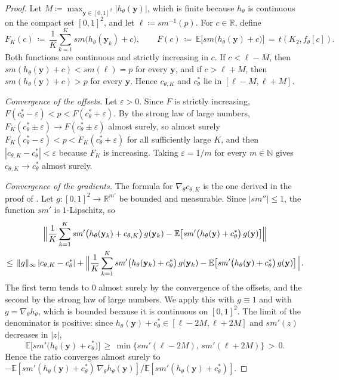\documentclass[11pt]{article}
\theoremstyle{plain}
\theoremstyle{definition}
\theoremstyle{remark}
\newcommand*{\R}{\mathbb{R}}
\begin{document}
\begin{proof}
Let $M \coloneqq \max_{\mathbf{y} \in [0,1]^2} |h_\theta(\mathbf{y})|$, which is finite because $h_\theta$ is continuous on the compact set $[0,1]^2$, and let $\ell \coloneqq \mathit{sm}^{-1}(p)$. For $c \in \R$, define
\[
F_K(c) \,\coloneqq\, \frac{1}{K} \sum_{k=1}^{K} \mathit{sm}\bigl(h_\theta(\mathbf{y}_k) + c\bigr),
\qquad
F(c) \,\coloneqq\, \mathbb{E}\bigl[\mathit{sm}\bigl(h_\theta(\mathbf{y}) + c\bigr)\bigr] \,=\, t(K_2, f_\theta[c]).
\]
Both functions are continuous and strictly increasing in $c$. If $c < \ell - M$, then $\mathit{sm}(h_\theta(\mathbf{y}) + c) < \mathit{sm}(\ell) = p$ for every $\mathbf{y}$, and if $c > \ell + M$, then $\mathit{sm}(h_\theta(\mathbf{y}) + c) > p$ for every $\mathbf{y}$. Hence $c_{\theta,K}$ and $c^*_\theta$ lie in $[\ell - M, \ell + M]$.

\emph{Convergence of the offsets.} Let $\varepsilon > 0$. Since $F$ is strictly increasing, $F(c^*_\theta - \varepsilon) < p < F(c^*_\theta + \varepsilon)$. By the strong law of large numbers, $F_K(c^*_\theta \pm \varepsilon) \to F(c^*_\theta \pm \varepsilon)$ almost surely, so almost surely $F_K(c^*_\theta - \varepsilon) < p < F_K(c^*_\theta + \varepsilon)$ for all sufficiently large $K$, and then $|c_{\theta,K} - c^*_\theta| < \varepsilon$ because $F_K$ is increasing. Taking $\varepsilon = 1/m$ for every $m \in \mathbb{N}$ gives $c_{\theta,K} \to c^*_\theta$ almost surely.

\emph{Convergence of the gradients.} The formula for $\nabla_\theta c_{\theta,K}$ is the one derived in the proof of . Let $g : [0,1]^2 \to \R^{m'}$ be bounded and measurable. Since $|\mathit{sm}''| \le 1$, the function $\mathit{sm}'$ is $1$-Lipschitz, so
\begin{multline*}
\Bigl\| \frac{1}{K} \sum_{k=1}^{K} \mathit{sm}'\bigl(h_\theta(\mathbf{y}_k) + c_{\theta,K}\bigr)\, g(\mathbf{y}_k) - \mathbb{E}\bigl[\mathit{sm}'\bigl(h_\theta(\mathbf{y}) + c^*_\theta\bigr)\, g(\mathbf{y})\bigr] \Bigr\|
\\
\le\, \|g\|_\infty\, |c_{\theta,K} - c^*_\theta|
+ \Bigl\| \frac{1}{K} \sum_{k=1}^{K} \mathit{sm}'\bigl(h_\theta(\mathbf{y}_k) + c^*_\theta\bigr)\, g(\mathbf{y}_k) - \mathbb{E}\bigl[\mathit{sm}'\bigl(h_\theta(\mathbf{y}) + c^*_\theta\bigr)\, g(\mathbf{y})\bigr] \Bigr\|.
\end{multline*}
The first term tends to $0$ almost surely by the convergence of the offsets, and the second by the strong law of large numbers. We apply this with $g \equiv 1$ and with $g = \nabla_\theta h_\theta$, which is bounded because it is continuous on $[0,1]^2$. The limit of the denominator is positive: since $h_\theta(\mathbf{y}) + c^*_\theta \in [\ell - 2M, \ell + 2M]$ and $\mathit{sm}'(z)$ decreases in $|z|$,
\[
\mathbb{E}\bigl[\mathit{sm}'\bigl(h_\theta(\mathbf{y}) + c^*_\theta\bigr)\bigr]
\,\ge\, \min\bigl\{\mathit{sm}'(\ell - 2M),\, \mathit{sm}'(\ell + 2M)\bigr\} \,>\, 0.
\]
Hence the ratio converges almost surely to $-\mathbb{E}[\mathit{sm}'(h_\theta(\mathbf{y}) + c^*_\theta)\, \nabla_\theta h_\theta(\mathbf{y})] / \mathbb{E}[\mathit{sm}'(h_\theta(\mathbf{y}) + c^*_\theta)]$.


\end{proof}
\end{document}
